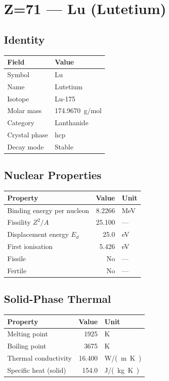 \documentclass[11pt,a4paper]{article}
\begin{document}
\newpage

\section{Z=71 --- Lu (Lutetium)}
\label{sec:Z71}

\subsection{Identity}
\begin{tabular}{ll}
  \toprule
  Field & Value \\
  \midrule
  Symbol & Lu \\
  Name & Lutetium \\
  Isotope & Lu-175 \\
  Molar mass & \SI{174.9670}{g/mol} \\
  Category & Lanthanide \\
  Crystal phase & hcp \\
  Decay mode & Stable \\
  \bottomrule
\end{tabular}

\subsection{Nuclear Properties}
\begin{tabular}{lrl}
  \toprule
  Property & Value & Unit \\
  \midrule
  Binding energy per nucleon & 8.2266 & \si{MeV} \\
  Fissility $Z^2/A$ & 25.100 & --- \\
  Displacement energy $E_d$ & 25.0 & \si{eV} \\
  First ionisation & 5.426 & \si{eV} \\
  Fissile & No & --- \\
  Fertile & No & --- \\
  \bottomrule
\end{tabular}

\subsection{Solid-Phase Thermal}
\begin{tabular}{lrl}
  \toprule
  Property & Value & Unit \\
  \midrule
  Melting point & 1925 & \si{K} \\
  Boiling point & 3675 & \si{K} \\
  Thermal conductivity & 16.400 & \si{W/(m.K)} \\
  Specific heat (solid) & 154.0 & \si{J/(kg.K)} \\
  \bottomrule
\end{tabular}
\end{document}
